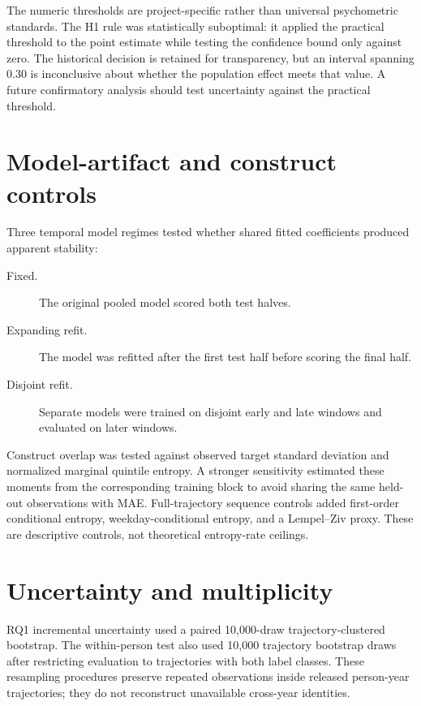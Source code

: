 \documentclass[a4paper,11pt,oneside]{report}
\begin{document}
The numeric thresholds are project-specific rather than universal psychometric
standards. The H1 rule was statistically suboptimal: it applied the practical
threshold to the point estimate while testing the confidence bound only against
zero. The historical decision is retained for transparency, but an interval spanning
0.30 is inconclusive about whether the population effect meets that value. A future
confirmatory analysis should test uncertainty against the practical threshold.

\section{Model-artifact and construct controls}

Three temporal model regimes tested whether shared fitted coefficients produced
apparent stability:

\begin{description}
  \item[Fixed.] The original pooled model scored both test halves.
  \item[Expanding refit.] The model was refitted after the first test half before
  scoring the final half.
  \item[Disjoint refit.] Separate models were trained on disjoint early and late
  windows and evaluated on later windows.
\end{description}

Construct overlap was tested against observed target standard deviation and
normalized marginal quintile entropy. A stronger sensitivity estimated these moments
from the corresponding training block to avoid sharing the same held-out observations
with MAE. Full-trajectory sequence controls added first-order conditional entropy,
weekday-conditional entropy, and a Lempel--Ziv proxy. These are descriptive controls,
not theoretical entropy-rate ceilings.

\section{Uncertainty and multiplicity}

RQ1 incremental uncertainty used a paired 10,000-draw trajectory-clustered
bootstrap. The within-person test also used 10,000 trajectory bootstrap draws after
restricting evaluation to trajectories with both label classes. These resampling
procedures preserve repeated observations inside released person-year trajectories;
they do not reconstruct unavailable cross-year identities.
\end{document}
